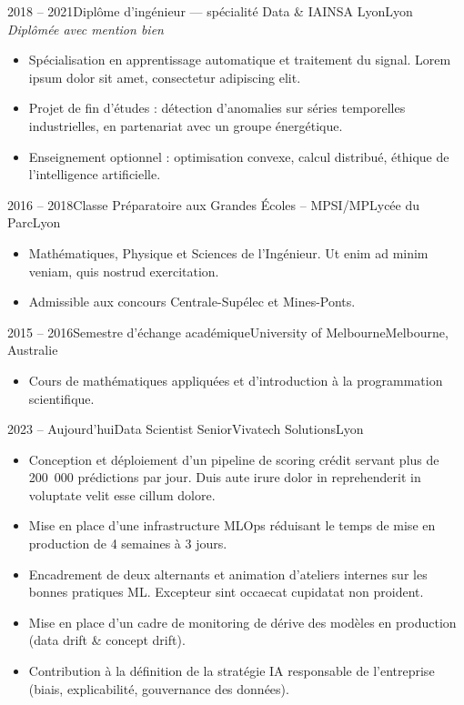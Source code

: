\documentclass[theme=pringlea]{myrtillecv}
\begin{document}

\begin{cventry}{2018 -- 2021}{Diplôme d'ingénieur --- spécialité Data \& IA}{INSA Lyon}{Lyon}
  \textit{Diplômée avec mention bien}
  \begin{itemize}
    \item Spécialisation en apprentissage automatique et traitement du signal. Lorem ipsum dolor sit amet, consectetur adipiscing elit.
    \item Projet de fin d'études : détection d'anomalies sur séries temporelles industrielles, en partenariat avec un groupe énergétique.
    \item Enseignement optionnel : optimisation convexe, calcul distribué, éthique de l'intelligence artificielle.
  \end{itemize}
\end{cventry}

\begin{cventry}{2016 -- 2018}{Classe Préparatoire aux Grandes Écoles -- MPSI/MP}{Lycée du Parc}{Lyon}
  \begin{itemize}
    \item Mathématiques, Physique et Sciences de l'Ingénieur. Ut enim ad minim veniam, quis nostrud exercitation.
    \item Admissible aux concours Centrale-Supélec et Mines-Ponts.
  \end{itemize}
\end{cventry}

\begin{cventry}{2015 -- 2016}{Semestre d'échange académique}{University of Melbourne}{Melbourne, Australie}
  \begin{itemize}
    \item Cours de mathématiques appliquées et d'introduction à la programmation scientifique.
  \end{itemize}
\end{cventry}


\begin{cventry}{2023 -- Aujourd'hui}{Data Scientist Senior}{Vivatech Solutions}{Lyon}
  \begin{itemize}
    \item Conception et déploiement d'un pipeline de scoring crédit servant plus de 200~000 prédictions par jour. Duis aute irure dolor in reprehenderit in voluptate velit esse cillum dolore.
    \item Mise en place d'une infrastructure MLOps réduisant le temps de mise en production de 4 semaines à 3 jours.
    \item Encadrement de deux alternants et animation d'ateliers internes sur les bonnes pratiques ML. Excepteur sint occaecat cupidatat non proident.
    \item Mise en place d'un cadre de monitoring de dérive des modèles en production (data drift \& concept drift).
    \item Contribution à la définition de la stratégie IA responsable de l'entreprise (biais, explicabilité, gouvernance des données).
  \end{itemize}
\end{cventry}
\end{document}
